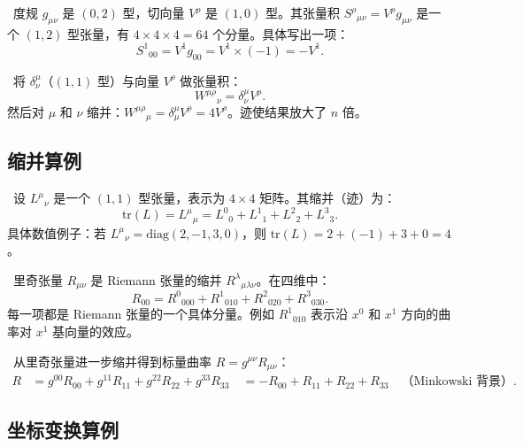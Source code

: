 \
度规 $g_{\mu\nu}$ 是 $(0,2)$ 型，切向量 $V^\rho$ 是 $(1,0)$ 型。其张量积 $S^\rho{}_{\mu\nu} = V^\rho g_{\mu\nu}$ 是一个 $(1,2)$ 型张量，有 $4 \times 4 \times 4 = 64$ 个分量。具体写出一项：
\begin{equation}
    S^1{}_{00} = V^1 g_{00} = V^1 \times (-1) = -V^1.
\end{equation}

\
将 $\delta^\mu_\nu$（$(1,1)$ 型）与向量 $V^\rho$ 做张量积：
\begin{equation}
    W^{\mu\rho}{}_{\nu} = \delta^\mu_\nu V^\rho.
\end{equation}
然后对 $\mu$ 和 $\nu$ 缩并：$W^{\mu\rho}{}_{\mu} = \delta^\mu_\mu V^\rho = 4 V^\rho$。迹使结果放大了 $n$ 倍。

\subsection{缩并算例}

\
设 $L^\mu{}_\nu$ 是一个 $(1,1)$ 型张量，表示为 $4 \times 4$ 矩阵。其缩并（迹）为：
\begin{equation}
    \text{tr}(L) = L^\mu{}_\mu = L^0{}_0 + L^1{}_1 + L^2{}_2 + L^3{}_3.
\end{equation}
具体数值例子：若 $L^\mu{}_\nu = \text{diag}(2, -1, 3, 0)$，则 $\text{tr}(L) = 2 + (-1) + 3 + 0 = 4$。

\
里奇张量 $R_{\mu\nu}$ 是 Riemann 张量的缩并 $R^\lambda{}_{\mu\lambda\nu}$。在四维中：
\begin{equation}
    R_{00} = R^0{}_{000} + R^1{}_{010} + R^2{}_{020} + R^3{}_{030}.
\end{equation}
每一项都是 Riemann 张量的一个具体分量。例如 $R^1{}_{010}$ 表示沿 $x^0$ 和 $x^1$ 方向的曲率对 $x^1$ 基向量的效应。

\
从里奇张量进一步缩并得到标量曲率 $R = g^{\mu\nu} R_{\mu\nu}$：
\begin{equation}
    \begin{aligned}
        R &= g^{00} R_{00} + g^{11} R_{11} + g^{22} R_{22} + g^{33} R_{33} \
          &= -R_{00} + R_{11} + R_{22} + R_{33} \quad \text{（Minkowski 背景）}.
    \end{aligned}
\end{equation}

\subsection{坐标变换算例}

